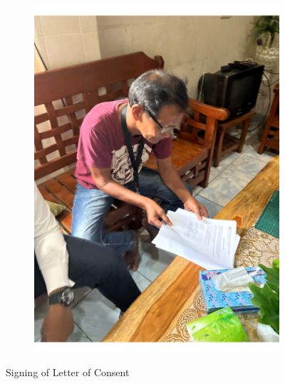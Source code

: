 \begin{appendices}
\begin{figure}[H]
\begin{subfigure}{0.4\textwidth}
        \includegraphics[width=\linewidth]{images/docs/sign2.pdf}
    \end{subfigure}
    \caption{Signing of Letter of Consent}
\end{figure}


\end{appendices}
